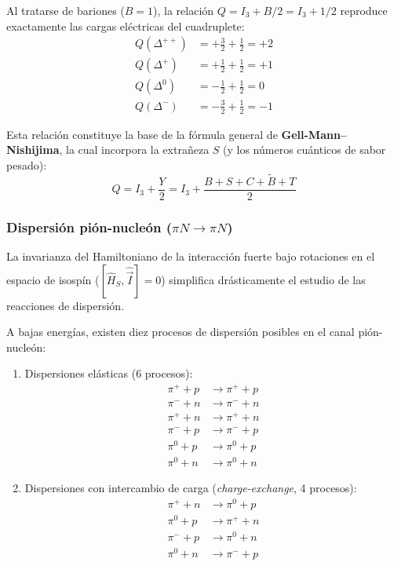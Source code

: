 Al tratarse de bariones ($B = 1$), la relación $Q = I_3 + B/2 = I_3 + 1/2$ reproduce exactamente las cargas eléctricas del cuadruplete:
\begin{align}
    Q(\Delta^{++}) &= +\frac{3}{2} + \frac{1}{2} = +2 \\
    Q(\Delta^+) &= +\frac{1}{2} + \frac{1}{2} = +1 \\
    Q(\Delta^0) &= -\frac{1}{2} + \frac{1}{2} = 0 \\
    Q(\Delta^-) &= -\frac{3}{2} + \frac{1}{2} = -1
\end{align}

Esta relación constituye la base de la fórmula general de \textbf{Gell-Mann--Nishijima}, la cual incorpora la extrañeza $S$ (y los números cuánticos de sabor pesado):
\begin{equation}
    Q = I_3 + \frac{Y}{2} = I_3 + \frac{B + S + C + \tilde{B} + T}{2}
\end{equation}

\subsubsection*{Dispersión pión-nucleón ($\pi N \to \pi N$)}

La invarianza del Hamiltoniano de la interacción fuerte bajo rotaciones en el espacio de isospín ($[\hat{H}_S, \hat{\vec{I}}] = 0$) simplifica drásticamente el estudio de las reacciones de dispersión.

A bajas energías, existen diez procesos de dispersión posibles en el canal pión-nucleón:
\begin{enumerate}
    \item Dispersiones elásticas (6 procesos):
    \begin{align}
        \pi^+ + p &\to \pi^+ + p \\
        \pi^- + n &\to \pi^- + n \\
        \pi^+ + n &\to \pi^+ + n \\
        \pi^- + p &\to \pi^- + p \\
        \pi^0 + p &\to \pi^0 + p \\
        \pi^0 + n &\to \pi^0 + n
    \end{align}
    \item Dispersiones con intercambio de carga (\textit{charge-exchange}, 4 procesos):
    \begin{align}
        \pi^+ + n &\to \pi^0 + p \\
        \pi^0 + p &\to \pi^+ + n \\
        \pi^- + p &\to \pi^0 + n \\
        \pi^0 + n &\to \pi^- + p
    \end{align}
\end{enumerate}

